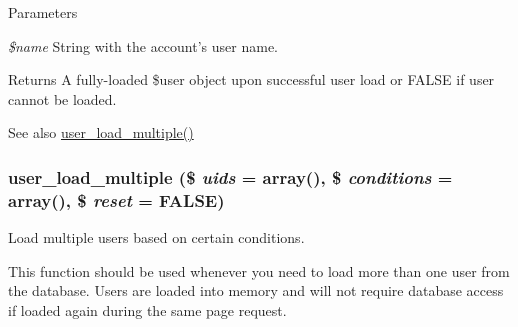 \begin{DoxyParams}{Parameters}
\item[{\em \$name}]String with the account's user name. \end{DoxyParams}
\begin{DoxyReturn}{Returns}
A fully-\/loaded \$user object upon successful user load or FALSE if user cannot be loaded.
\end{DoxyReturn}
\begin{DoxySeeAlso}{See also}
\hyperlink{user_8module_a9f73ad4a543faed0e38e8ea170bff32e}{user\_\-load\_\-multiple()} 
\end{DoxySeeAlso}
\hypertarget{user_8module_a9f73ad4a543faed0e38e8ea170bff32e}{
\subsubsection[{user\_\-load\_\-multiple}]{\setlength{\rightskip}{0pt plus 5cm}user\_\-load\_\-multiple (\$ {\em uids} = {\ttfamily array()}, \/  \$ {\em conditions} = {\ttfamily array()}, \/  \$ {\em reset} = {\ttfamily FALSE})}}
\label{user_8module_a9f73ad4a543faed0e38e8ea170bff32e}
Load multiple users based on certain conditions.

This function should be used whenever you need to load more than one user from the database. Users are loaded into memory and will not require database access if loaded again during the same page request.


